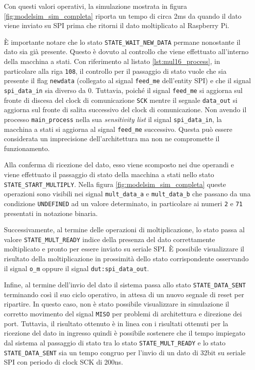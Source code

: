 \documentclass[titlepage]{report}
\begin{document}
		Con questi valori operativi, la simulazione mostrata in figura \ref{fig:modelsim_sim_completa} riporta un tempo di circa 2ms da quando il dato viene inviato su SPI prima che ritorni il dato moltiplicato al Raspberry Pi.

		È importante notare che lo stato \texttt{STATE\_WAIT\_NEW\_DATA} permane nonostante il dato sia già presente. Questo è dovuto al controllo che viene effettuato all'interno della macchina a stati. Con riferimento al listato \ref*{lst:mul16_process}, in particolare alla riga \texttt{108}, il controllo per il passaggio di stato vuole che sia presente il flag \texttt{newdata} (collegato al signal \texttt{feed\_me} dell'entity SPI) e che il signal \texttt{spi\_data\_in} sia diverso da 0.  Tuttavia, poiché il signal \texttt{feed\_me} si aggiorna sul fronte di discesa del clock di comunicazione \texttt{SCK} mentre il segnale \texttt{data\_out} si aggiorna sul fronte di salita successivo del clock di comunicazione. Non avendo il processo \texttt{main\_process} nella sua \textit{sensitivity list} il signal \texttt{spi\_data\_in}, la macchina a stati si aggiorna al signal \texttt{feed\_me} successivo.
		Questa può essere considerata un imprecisione dell'architettura ma non ne compromette il funzionamento.

		Alla conferma di ricezione del dato, esso viene scomposto nei due operandi e viene effettuato il passaggio di stato della macchina a stati nello stato \texttt{STATE\_START\_MULTIPLY}. Nella figura \ref{fig:modelsim_sim_completa} queste operazioni sono visibili nei signal \texttt{mult\_data\_a} e \texttt{mult\_data\_b} che passano da una condizione \texttt{UNDEFINED} ad un valore determinato, in particolare ai numeri \texttt{2} e \texttt{71} presentati in notazione binaria.

		Successivamente, al termine delle operazioni di moltiplicazione, lo stato passa al valore \texttt{STATE\_MULT\_READY} indice della presenza del dato correttamente moltiplicato e pronto per essere inviato su seriale SPI. È possibile visualizzare il risultato della moltiplicazione in prossimità dello stato corrispondente osservando il signal \texttt{o\_m} oppure il signal \texttt{dut:spi\_data\_out}.

		Infine, al termine dell'invio del dato il sistema passa allo stato \texttt{STATE\_DATA\_SENT} terminando così il suo ciclo operativo, in attesa di un nuovo segnale di reset per ripartire. In questo caso, non è stato possibile visualizzare in simulazione il corretto movimento del signal \texttt{MISO} per problemi di architettura e direzione dei port.
		Tuttavia, il risultato ottenuto è in linea con i risultati ottenuti per la ricezione del dato in ingresso quindi è possibile sostenere che il tempo impiegato dal sistema al passaggio di stato tra lo stato \texttt{STATE\_MULT\_READY} e lo stato \texttt{STATE\_DATA\_SENT} sia un tempo congruo per l'invio di un dato di 32bit su seriale SPI con periodo di clock SCK di 200ns.
\end{document}
